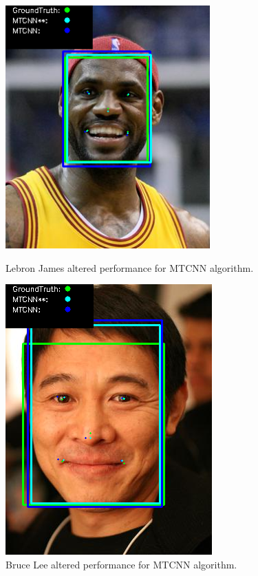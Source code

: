 \documentclass{l4proj}
\begin{document}
\begin{figure}[h!]
  \centering
  \begin{minipage}{0.49\textwidth}
    \centering

    \includegraphics[width=0.70\textwidth]{images/lebron_result.png}
    \caption{Lebron James altered performance for MTCNN algorithm.}
    \label{lebron_result}
  \end{minipage}
  \hfill
    \begin{minipage}{0.49\textwidth}
      \centering
    \includegraphics[width=.63\textwidth]{images/bruce_result.png}
    \caption{Bruce Lee altered performance for MTCNN algorithm.}
    \label{bruce_result}
  \end{minipage}
  \hfill
\end{figure}
\end{document}
